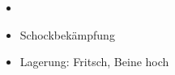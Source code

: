 \label{m:blutung-nachgeburtsperiode}
\label{proc:GO72000C}
\begin{itemize}
	\item \TxMassVitMK
	\item Schockbekämpfung
	\item Lagerung: Fritsch, Beine hoch
\end{itemize}